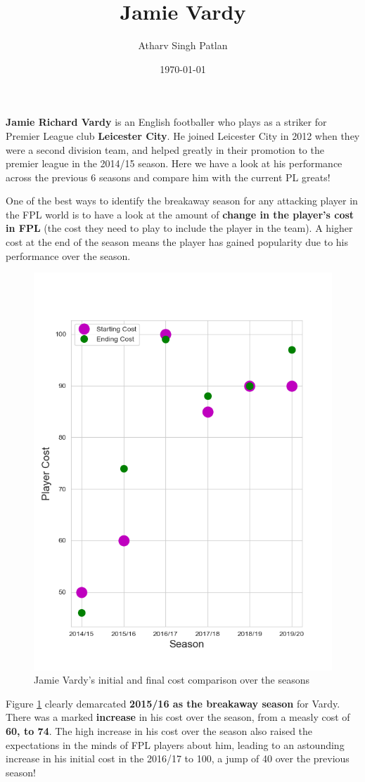 \documentclass{article}
\title{\textbf{Jamie Vardy}}
\author{Atharv Singh Patlan}
\date{\today}
\begin{document}
\maketitle
\textbf{Jamie Richard Vardy} is an English footballer who plays as a striker for Premier League club \textbf{Leicester City}. He joined Leicester City in 2012 when they were a second division team, and helped greatly in their promotion to the premier league in the 2014/15 season. Here we have a look at his performance across the previous 6 seasons and compare him with the current PL greats!

One of the best ways to identify the breakaway season for any attacking player in the FPL world is to have a look at the amount of \textbf{change in the player's cost in FPL} (the cost they need to play to include the player in the team). A higher cost at the end of the season means the player has gained popularity due to his performance over the season.
\begin{figure}[H]
    \centering
    \includegraphics[width=0.6\linewidth]{assets/cost_season.png}
    \caption{Jamie Vardy's initial and final cost comparison over the seasons}
    \label{fig:cost_season}
\end{figure}

Figure \ref{fig:cost_season} clearly demarcated \textbf{2015/16 as the breakaway season} for Vardy. There was a marked \textbf{increase} in his cost over the season, from a measly cost of \textbf{60, to 74}. The high increase in his cost over the season also raised the expectations in the minds of FPL players about him, leading to an astounding increase in his initial cost in the 2016/17 to 100, a jump of 40 over the previous season!
\end{document}
